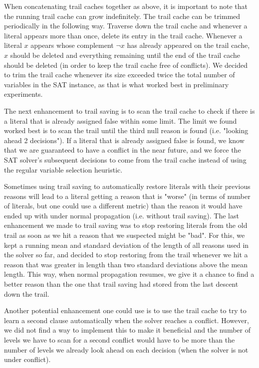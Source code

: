 \documentclass[runningheads]{llncs}
\begin{document}
When concatenating trail caches together as above, it is important to
note that the running trail cache can grow indefinitely. The trail
cache can be trimmed periodically in the following way. Traverse down
the trail cache and whenever a literal appears more than once, delete
its entry in the trail cache. Whenever a literal $x$ appears whose
complement $\lnot x$ has already appeared on the trail cache, $x$
should be deleted and everything remaining until the end of the trail
cache should be deleted (in order to keep the trail cache free of
conflicts).  We decided to trim the trail cache whenever its size
exceeded twice the total number of variables in the SAT instance, as
that is what worked best in preliminary experiments.\newline

The next enhancement to trail saving is to scan the trail cache to
check if there is a literal that is already assigned false within some
limit. The limit we found worked best is to scan the trail until the
third null reason is found (i.e. "looking ahead 2 decisions"). If a
literal that is already assigned false is found, we know that we are
guaranteed to have a conflict in the near future, and we force the SAT
solver's subsequent decisions to come from the trail cache instead of
using the regular variable selection heuristic.

Sometimes using trail saving to automatically restore literals with
their previous reasons will lead to a literal getting a reason that is
"worse" (in terms of number of literals, but one could use a different
metric) than the reason it would have ended up with under normal
propagation (i.e. without trail saving). The last enhancement we made
to trail saving was to stop restoring literals from the old trail as
soon as we hit a reason that we suspected might be "bad". For this, we
kept a running mean and standard deviation of the length of all
reasons used in the solver so far, and decided to stop restoring from
the trail whenever we hit a reason that was greater in length than two
standard deviations above the mean length. This way, when normal
propagation resumes, we give it a chance to find a better reason than
the one that trail saving had stored from the last descent down the
trail.

Another potential enhancement one could use is to use the trail cache
to try to learn a second clause automatically when the solver reaches
a conflict. However, we did not find a way to implement this to make
it beneficial and the number of levels we have to scan for a second
conflict would have to be more than the number of levels we already
look ahead on each decision (when the solver is not under conflict).
\end{document}
